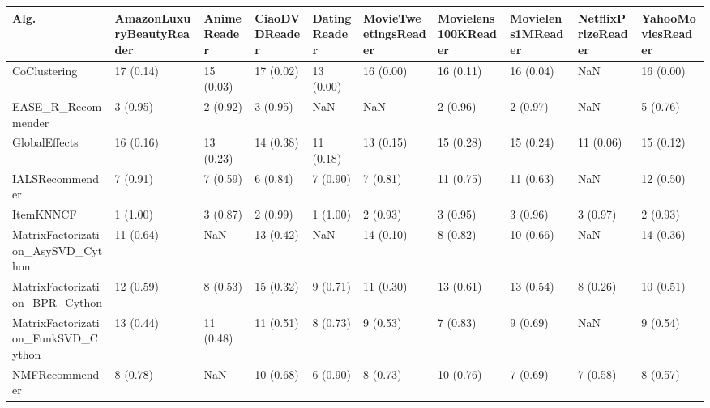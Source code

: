 \begin{tabular}{llllllllll}
\toprule
                               Alg. & AmazonLuxuryBeautyReader & AnimeReader & CiaoDVDReader & DatingReader & MovieTweetingsReader & Movielens100KReader & Movielens1MReader & NetflixPrizeReader & YahooMoviesReader \\
\midrule
                       CoClustering &                17 (0.14) &   15 (0.03) &     17 (0.02) &    13 (0.00) &            16 (0.00) &           16 (0.11) &         16 (0.04) &                NaN &         16 (0.00) \\
                 EASE\_R\_Recommender &                 3 (0.95) &    2 (0.92) &      3 (0.95) &          NaN &                  NaN &            2 (0.96) &          2 (0.97) &                NaN &          5 (0.76) \\
                      GlobalEffects &                16 (0.16) &   13 (0.23) &     14 (0.38) &    11 (0.18) &            13 (0.15) &           15 (0.28) &         15 (0.24) &          11 (0.06) &         15 (0.12) \\
                    IALSRecommender &                 7 (0.91) &    7 (0.59) &      6 (0.84) &     7 (0.90) &             7 (0.81) &           11 (0.75) &         11 (0.63) &                NaN &         12 (0.50) \\
                          ItemKNNCF &                 1 (1.00) &    3 (0.87) &      2 (0.99) &     1 (1.00) &             2 (0.93) &            3 (0.95) &          3 (0.96) &           3 (0.97) &          2 (0.93) \\
  MatrixFactorization\_AsySVD\_Cython &                11 (0.64) &         NaN &     13 (0.42) &          NaN &            14 (0.10) &            8 (0.82) &         10 (0.66) &                NaN &         14 (0.36) \\
     MatrixFactorization\_BPR\_Cython &                12 (0.59) &    8 (0.53) &     15 (0.32) &     9 (0.71) &            11 (0.30) &           13 (0.61) &         13 (0.54) &           8 (0.26) &         10 (0.51) \\
 MatrixFactorization\_FunkSVD\_Cython &                13 (0.44) &   11 (0.48) &     11 (0.51) &     8 (0.73) &             9 (0.53) &            7 (0.83) &          9 (0.69) &                NaN &          9 (0.54) \\
                     NMFRecommender &                 8 (0.78) &         NaN &     10 (0.68) &     6 (0.90) &             8 (0.73) &           10 (0.76) &          7 (0.69) &           7 (0.58) &          8 (0.57) \\

\end{tabular}
